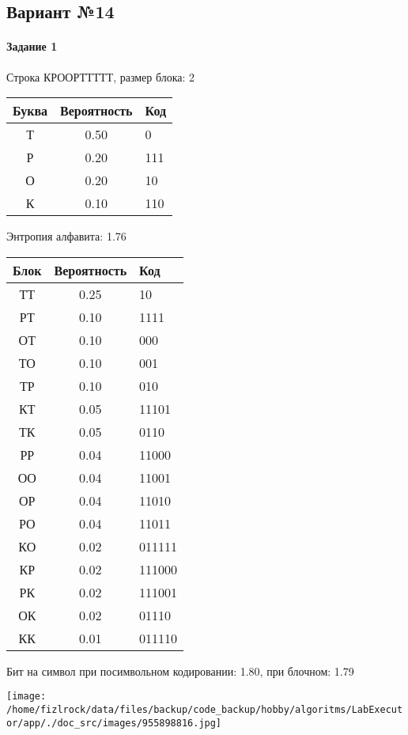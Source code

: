 \documentclass[a4paper, 12pt]{article}
\begin{document}
\subsection{Вариант №14}
\paragraph{Задание 1}

Строка КРООРТТТТТ, размер блока: 2
\begin{center}
 \begin{tabular}{ |c|c|l| } 
  \hline
     Буква & Вероятность & Код\\ \hline
Т & 0.50 & 0\\\hline
Р & 0.20 & 111\\\hline
О & 0.20 & 10\\\hline
К & 0.10 & 110
\\ \hline \end{tabular}
\end{center}
Энтропия алфавита: 1.76
\begin{center}
 \begin{tabular}{ |c|c|l| } 
  \hline
     Блок & Вероятность & Код\\ \hline
ТТ & 0.25 & 10\\\hline
РТ & 0.10 & 1111\\\hline
ОТ & 0.10 & 000\\\hline
ТО & 0.10 & 001\\\hline
ТР & 0.10 & 010\\\hline
КТ & 0.05 & 11101\\\hline
ТК & 0.05 & 0110\\\hline
РР & 0.04 & 11000\\\hline
ОО & 0.04 & 11001\\\hline
ОР & 0.04 & 11010\\\hline
РО & 0.04 & 11011\\\hline
КО & 0.02 & 011111\\\hline
КР & 0.02 & 111000\\\hline
РК & 0.02 & 111001\\\hline
ОК & 0.02 & 01110\\\hline
КК & 0.01 & 011110
\\ \hline \end{tabular}
\end{center}
Бит на символ при посимвольном кодировании: 1.80, при блочном: 1.79

\texttt{[image: /home/fizlrock/data/files/backup/code\_backup/hobby/algoritms/LabExecutor/app/./doc\_src/images/955898816.jpg]}
\end{document}
